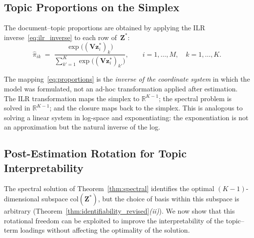\subsection{Topic Proportions on the Simplex}
\label{subsec:proportions}

The document--topic proportions are obtained by applying the ILR
inverse~\eqref{eq:ilr_inverse} to each row of~$\mathbf{Z}^*$:
\begin{equation}
  \hat{\pi}_{ik}
  \;=\;
  \frac{\exp\!\bigl((\mathbf{V}\mathbf{z}_i^*)_k\bigr)}
       {\displaystyle\sum_{k'=1}^{K}
        \exp\!\bigl((\mathbf{V}\mathbf{z}_i^*)_{k'}\bigr)},
  \qquad i=1,\dots,M,\quad k=1,\dots,K.
  \label{eq:proportions}
\end{equation}

\begin{remark}
\label{rem:closure_not_posthoc}
The
mapping~\eqref{eq:proportions} is the \emph{inverse of the coordinate
system} in which the model was formulated, not an ad-hoc transformation
applied after estimation. The ILR transformation maps the simplex to
$\mathbb{R}^{K-1}$; the spectral problem is solved in
$\mathbb{R}^{K-1}$; and the closure maps back to the simplex.
This is analogous to solving a linear system in log-space and
exponentiating: the exponentiation is not an approximation but the
natural inverse of the log.
\end{remark}

\subsection{Post-Estimation Rotation for Topic Interpretability}
\label{subsec:rotation}
 
The spectral solution of Theorem~\ref{thm:spectral} identifies the
optimal $(K{-}1)$-dimensional subspace
$\mathrm{col}(\mathbf{Z}^*)$, but the choice of basis within this
subspace is arbitrary
(Theorem~\ref{thm:identifiability_revised}\emph{(ii)}). We now show
that this rotational freedom can be exploited to improve the
interpretability of the topic--term loadings without affecting the
optimality of the solution.
 
